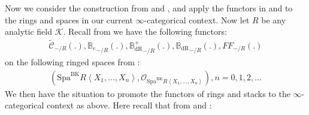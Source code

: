 \documentclass[12pt]{book}
\begin{document}
Now we consider the construction from \cite[Definition 9.3.3, Definition 9.3.5, Definition 9.3.11, Definition 9.3.9]{KL1} and \cite{KL2}, and apply the functors in \cite[Definition 9.3.3, Definition 9.3.5, Definition 9.3.11, Definition 9.3.9]{KL1} and \cite{KL2} to the rings and spaces in our current $\infty$-categorical context. Now let $R$ be any analytic field $\mathcal{K}$. Recall from \cite[Definition 9.3.3, Definition 9.3.5, Definition 9.3.11, Definition 9.3.9]{KL1} we have the following functors:
\begin{align}
\widetilde{\mathcal{C}}_{-/R}(.),{\mathbb{B}_e}_{-/R}(.),{\mathbb{B}_\mathrm{dR}^+}_{-/R}(.),{\mathbb{B}_\mathrm{dR}}_{-/R}(.),{FF}_{-/R}(.)	
\end{align}
on the following ringed spaces from \cite{BK}:
\begin{align}
(\mathrm{Spa}^\mathrm{BK}R\left<X_1,...,X_n\right>,\mathcal{O}_{\mathrm{Spa}^\mathrm{BK}R\left<X_1,...,X_n\right>}),n=0,1,2,...	
\end{align}
We then have the situation to promote the functors of rings and stacks to the $\infty$-categorical context as above. Here recall that from \cite[Definition 9.3.3, Definition 9.3.5, Definition 9.3.11, Definition 9.3.9]{KL1} and \cite{KL2}:
\end{document}

